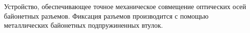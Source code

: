 Устройство, обеспечивающее точное механическое совмещение 
оптических осей байонетных разъемов. Фиксация разъемов 
производится с помощью металлических байонетных
подпружиненных втулок.